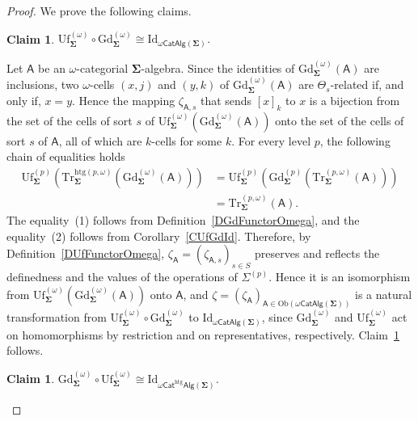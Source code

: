 \documentclass[a4paper, reqno]{amsbook}
\newcommand{\sig}[1]{\mathbf{#1}}             %
\newcommand{\calg}[1]{\boldsymbol{\mathsf{#1}}} %
\newcommand{\htg}{\mathrm{htg}}                %
\newcommand{\Id}{\mathrm{Id}}
\newcommand{\Gd}{\mathrm{Gd}}
\newcommand{\Uf}{\mathrm{Uf}}
\newcommand{\Tr}{\mathrm{Tr}}
\theoremstyle{plain}
\newtheorem{claim}[theorem]{Claim}
\theoremstyle{definition}
\begin{document}
\begin{proof}
We prove the following claims.

\begin{claim}\label{ClGdUfIsoOmegaA}
$\Uf^{(\omega)}_{\sig{\Sigma}}\circ\Gd^{(\omega)}_{\sig{\Sigma}}\cong\Id_{\omega\mathsf{CatAlg}(\sig{\Sigma})}$.
\end{claim}

Let $\calg{A}$ be an $\omega$-categorial $\sig{\Sigma}$-algebra.
Since the identities of $\Gd^{(\omega)}_{\sig{\Sigma}}(\calg{A})$ are inclusions, two $\omega$-cells $(x,j)$ and $(y,k)$ of $\Gd^{(\omega)}_{\sig{\Sigma}}(\calg{A})$ are $\Theta_{s}$-related if, and only if, $x=y$.
Hence the mapping $\zeta_{\calg{A},s}$ that sends $[x]_{k}$ to $x$ is a bijection from the set of the cells of sort $s$ of $\Uf^{(\omega)}_{\sig{\Sigma}}(\Gd^{(\omega)}_{\sig{\Sigma}}(\calg{A}))$ onto the set of the cells of sort $s$ of $\calg{A}$, all of which are $k$-cells for some $k$.
For every level $p$, the following chain of equalities holds
\begin{align*}
\Uf^{(p)}_{\sig{\Sigma}}\left(\Tr^{\htg(p,\omega)}_{\sig{\Sigma}}\left(\Gd^{(\omega)}_{\sig{\Sigma}}(\calg{A})\right)\right)
&=
\Uf^{(p)}_{\sig{\Sigma}}\left(\Gd^{(p)}_{\sig{\Sigma}}\left(\Tr^{(p,\omega)}_{\sig{\Sigma}}(\calg{A})\right)\right)
\tag{1}
\\&=
\Tr^{(p,\omega)}_{\sig{\Sigma}}(\calg{A}).
\tag{2}
\end{align*}
The equality~(1) follows from Definition~\ref{DGdFunctorOmega}, and the equality~(2) follows from Corollary~\ref{CUfGdId}.
Therefore, by Definition~\ref{DUfFunctorOmega}, $\zeta_{\calg{A}}=(\zeta_{\calg{A},s})_{s\in S}$ preserves and reflects the definedness and the values of the operations of $\Sigma^{(p)}$.
Hence it is an isomorphism from $\Uf^{(\omega)}_{\sig{\Sigma}}(\Gd^{(\omega)}_{\sig{\Sigma}}(\calg{A}))$ onto $\calg{A}$, and $\zeta=(\zeta_{\calg{A}})_{\calg{A}\in\mathrm{Ob}(\omega\mathsf{CatAlg}(\sig{\Sigma}))}$ is a natural transformation from $\Uf^{(\omega)}_{\sig{\Sigma}}\circ\Gd^{(\omega)}_{\sig{\Sigma}}$ to $\Id_{\omega\mathsf{CatAlg}(\sig{\Sigma})}$, since $\Gd^{(\omega)}_{\sig{\Sigma}}$ and $\Uf^{(\omega)}_{\sig{\Sigma}}$ act on homomorphisms by restriction and on representatives, respectively.
Claim~\ref{ClGdUfIsoOmegaA} follows.

\begin{claim}\label{ClGdUfIsoOmegaB}
$\Gd^{(\omega)}_{\sig{\Sigma}}\circ\Uf^{(\omega)}_{\sig{\Sigma}}\cong\Id_{\omega\mathsf{Cat}^{\htg}\mathsf{Alg}(\sig{\Sigma})}$.
\end{claim}


\end{proof}
\end{document}
